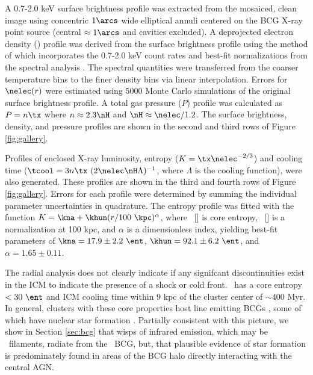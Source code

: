 \documentclass[11pt, preprint]{aastex}
\begin{document}
A 0.7-2.0 keV surface brightness profile was extracted from the
mosaiced, clean image using concentric $1\arcs$ wide elliptical annuli
centered on the BCG X-ray point source (central $\approx 1\arcs$ and
cavities excluded). A deprojected electron density (\nelec) profile
was derived from the surface brightness profile using the method of
\citet{kriss83} which incorporates the 0.7-2.0 keV count rates and
best-fit normalizations from the spectral analysis \citep[see][for
  details]{accept}. The spectral quantities were transferred from the
coarser temperature bins to the finer density bins via linear
interpolation. Errors for $\nelec(r)$ were estimated using 5000 Monte
Carlo simulations of the original surface brightness profile. A total
gas pressure ($P$) profile was calculated as $P = n \tx$ where $n
\approx 2.3 \nH$ and $\nH \approx \nelec/1.2$. The surface brightness,
density, and pressure profiles are shown in the second and third rows
of Figure \ref{fig:gallery}.

Profiles of enclosed X-ray luminosity, entropy ($K = \tx
\nelec^{-2/3}$) and cooling time ($\tcool = 3 n \tx~(2 \nelec \nH
\Lambda)^{-1}$, where $\Lambda$ is the cooling function), were also
generated. These profiles are shown in the third and fourth rows of
Figure \ref{fig:gallery}. Errors for each profile were determined by
summing the individual parameter uncertainties in quadrature. The
entropy profile was fitted with the function $K = \kna +\khun (r/100
~\kpc)^{\alpha}$, where \kna\ [\ent] is core entropy, \khun\ [\ent] is
a normalization at 100 kpc, and $\alpha$ is a dimensionless index,
yielding best-fit parameters of $\kna = 17.9 \pm 2.2 ~\ent$, $\khun =
92.1 \pm 6.2 ~\ent$, and $\alpha = 1.65 \pm 0.11$.

The radial analysis does not clearly indicate if any signifcant
discontinuities exist in the ICM to indicate the presence of a shock
or cold front. \rbs\ has a core entropy $< 30 ~\ent$ and ICM cooling
time within 9 kpc of the cluster center of $\sim 400$ Myr. In general,
clusters with these core properties host line emitting BCGs
\citep[\eg][]{crawford99, edge01, haradent}, some of which have
nuclear star formation \citep[\eg][]{rafferty08}. Partially consistent
with this picture, we show in Section \ref{sec:bcg} that wisps of
infrared emission, which may be \halpha\ filaments, radiate from the
\rbs\ BCG, but, that plausible evidence of star formation is
predominately found in areas of the BCG halo directly interacting with
the central AGN.

\end{document}
